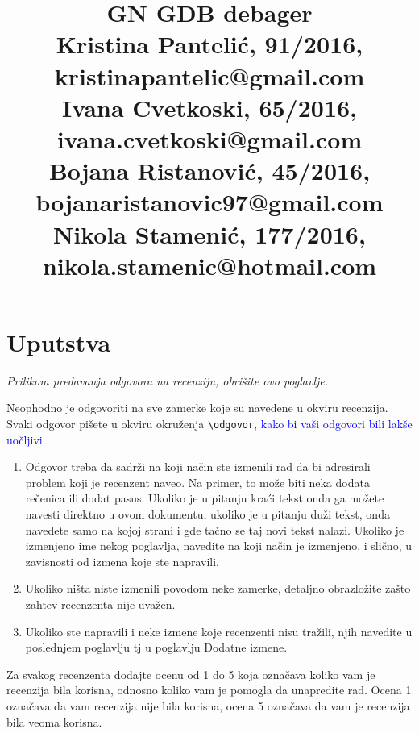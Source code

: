\documentclass[a4paper]{report}
\newcommand{\odgovor}[1]{\textcolor{blue}{#1}}
\begin{document}
\title{GN GDB debager\\ \small{
Kristina Pantelić, 91/2016, kristinapantelic@gmail.com 
\\
Ivana Cvetkoski, 65/2016, ivana.cvetkoski@gmail.com
\\
Bojana Ristanović, 45/2016, bojanaristanovic97@gmail.com
\\
Nikola Stamenić, 177/2016, nikola.stamenic@hotmail.com}}

\maketitle

\tableofcontents

\chapter{Uputstva}
\emph{Prilikom predavanja odgovora na recenziju, obrišite ovo poglavlje.}

Neophodno je odgovoriti na sve zamerke koje su navedene u okviru recenzija. Svaki odgovor pišete u okviru okruženja \verb"\odgovor", \odgovor{kako bi vaši odgovori bili lakše uočljivi.} 
\begin{enumerate}

\item Odgovor treba da sadrži na koji način ste izmenili rad da bi adresirali problem koji je recenzent naveo. Na primer, to može biti neka dodata rečenica ili dodat pasus. Ukoliko je u pitanju kraći tekst onda ga možete navesti direktno u ovom dokumentu, ukoliko je u pitanju duži tekst, onda navedete samo na kojoj strani i gde tačno se taj novi tekst nalazi. Ukoliko je izmenjeno ime nekog poglavlja, navedite na koji način je izmenjeno, i slično, u zavisnosti od izmena koje ste napravili. 

\item Ukoliko ništa niste izmenili povodom neke zamerke, detaljno obrazložite zašto zahtev recenzenta nije uvažen.

\item Ukoliko ste napravili i neke izmene koje recenzenti nisu tražili, njih navedite u poslednjem poglavlju tj u poglavlju Dodatne izmene.
\end{enumerate}

Za svakog recenzenta dodajte ocenu od 1 do 5 koja označava koliko vam je recenzija bila korisna, odnosno koliko vam je pomogla da unapredite rad. Ocena 1 označava da vam recenzija nije bila korisna, ocena 5 označava da vam je recenzija bila veoma korisna. 
\end{document}
